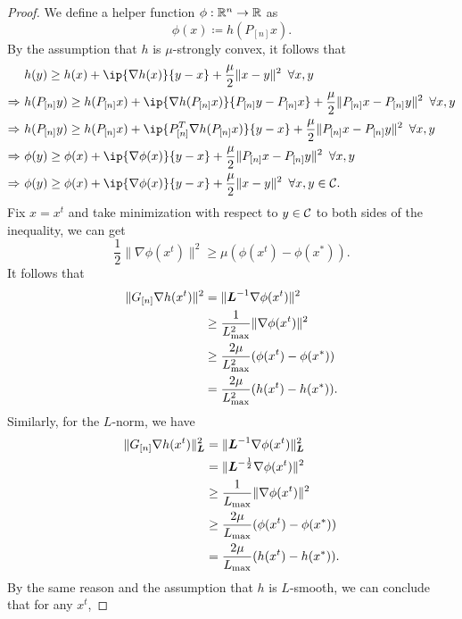 \begin{proof}
    We define a helper function $\phi:\mathbb{R}^n\to\mathbb{R}$ as 
    \[\phi(x) \coloneqq h(P_{[n]}x).\]
    By the assumption that $h$ is $\mu$-strongly convex, it follows that 
    \begin{align*}
        &~ h(y) \geq h(x) + \ip{\nabla h(x)}{y-x} + \frac{\mu}{2}\|x-y\|^2 \enspace \forall x, y\\
        \Rightarrow &~  h(P_{[n]}y) \geq h(P_{[n]}x) + \ip{\nabla h(P_{[n]}x)}{P_{[n]}y-P_{[n]}x} + \frac{\mu}{2}\|P_{[n]}x-P_{[n]}y\|^2 \enspace \forall x, y\\
        \Rightarrow &~  h(P_{[n]}y) \geq h(P_{[n]}x) + \ip{P_{[n]}^T\nabla h(P_{[n]}x)}{y-x} + \frac{\mu}{2}\|P_{[n]}x-P_{[n]}y\|^2 \enspace \forall x, y\\
        \Rightarrow &~  \phi(y) \geq \phi(x) + \ip{\nabla \phi(x)}{y-x} + \frac{\mu}{2}\|P_{[n]}x-P_{[n]}y\|^2 \enspace \forall x, y\\
        \Rightarrow &~  \phi(y) \geq \phi(x) + \ip{\nabla \phi(x)}{y-x} + \frac{\mu}{2}\|x-y\|^2 \enspace \forall x, y \in \Cscr.
    \end{align*}
    Fix $x = x^t$ and take minimization with respect to $y \in \mathcal{C}$ to both sides of the inequality, we can get 
    \[\frac{1}{2}\|\nabla \phi(x^t)\|^2 \geq \mu(\phi(x^t) - \phi(x^*)).\]
    It follows that 
    \begin{align*}
        \|G_{[n]}\nabla h(x^t)\|^2 &= \|\boldsymbol{L}^{-1}\nabla \phi(x^t)\|^2
        \\&\geq \frac{1}{L_{\max}^2} \|\nabla \phi(x^t)\|^2
        \\&\geq \frac{2\mu}{L_{\max}^2}(\phi(x^t) - \phi(x^*))
        \\&= \frac{2\mu}{L_{\max}^2}(h(x^t) - h(x^*)).
    \end{align*}
    Similarly, for the $L$-norm, we have
    \begin{align*}
        \|G_{[n]}\nabla h(x^t)\|_{\boldsymbol{L}}^2 &= \|\boldsymbol{L}^{-1}\nabla \phi(x^t)\|_{\boldsymbol{L}}^2
        \\&= \|\boldsymbol{L}^{-\frac{1}{2}}\nabla \phi(x^t)\|^2
        \\&\geq \frac{1}{L_{\max}} \|\nabla \phi(x^t)\|^2
        \\&\geq \frac{2\mu}{L_{\max}}(\phi(x^t) - \phi(x^*))
        \\&= \frac{2\mu}{L_{\max}}(h(x^t) - h(x^*)).
    \end{align*}
    By the same reason and the assumption that $h$ is $L$-smooth, we can conclude that for any $x^t$,

\end{proof}
